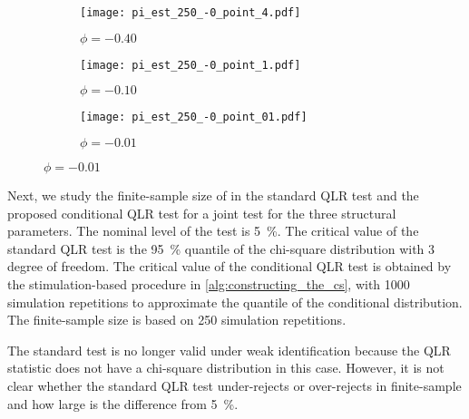 \documentclass[11pt, letterpaper, twoside]{article}
\begin{document}
\begin{figure}[htb]
  
  \caption[t-statistics]{Parameter Estimates}
  \label{fig:sim_parameter_estimates}


  \begin{subfigure}[t]{.32\textwidth}
    \caption[phi = -0.40]{$\phi = -0.40$}
    \texttt{[image: pi\_est\_250\_-0\_point\_4.pdf]}
  \end{subfigure}
  \begin{subfigure}[t]{.32\textwidth}
    \caption[phi = -0.10]{$\phi = -0.10$}
    \texttt{[image: pi\_est\_250\_-0\_point\_1.pdf]}
  \end{subfigure}
  \begin{subfigure}[t]{.32\textwidth}
    \caption[phi = -0.01]{$\phi = -0.01$}
    \texttt{[image: pi\_est\_250\_-0\_point\_01.pdf]}
  \end{subfigure}

\end{figure}


Next, we study the finite-sample size of in the standard QLR test and the proposed conditional QLR test for a joint test for the three structural parameters. The nominal level of the test is \SI{5}{\percent}. The critical value of the standard QLR test is the \SI{95}{\percent} quantile of the chi-square distribution with $3$ degree of freedom. The critical value of the conditional QLR test is obtained by the stimulation-based procedure in \cref{alg:constructing_the_cs}, with \num{1000} simulation repetitions to approximate the quantile of the conditional distribution. The finite-sample size is based on \num{250} simulation repetitions.

The standard test is no longer valid under weak identification because the QLR statistic does not have a chi-square distribution in this case. However, it is not clear whether the standard QLR test under-rejects or over-rejects in finite-sample and how large is the difference from \SI{5}{\percent}. 
\end{document}
